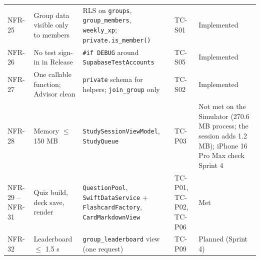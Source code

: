 \documentclass[12pt,letterpaper]{article}
\begin{document}
\begin{xltabular}{\textwidth}{@{}l L{3.2cm} Y l L{2.6cm}@{}}
NFR-25 & Group data visible only to members & RLS on \texttt{groups}, \texttt{group\_members}, \texttt{weekly\_xp}; \texttt{private.is\_member()} & TC-S01 & Implemented \\
NFR-26 & No test sign-in in Release & \texttt{\#if DEBUG} around \texttt{SupabaseTestAccounts} & TC-S05 & Implemented \\
NFR-27 & One callable function; Advisor clean & \texttt{private} schema for helpers; \texttt{join\_group} only & TC-S02 & Implemented \\
NFR-28 & Memory $\le$ 150 MB & \texttt{StudySessionViewModel}, \texttt{StudyQueue} & TC-P03 & Not met on the Simulator (270.6 MB process; the session adds 1.2 MB); iPhone 16 Pro Max check Sprint 4 \\
NFR-29 -- NFR-31 & Quiz build, deck save, render & \texttt{QuestionPool}, \texttt{SwiftDataService} + \texttt{FlashcardFactory}, \texttt{CardMarkdownView} & TC-P01, TC-P02, TC-P06 & Met \\
NFR-32 & Leaderboard $\le$ 1.5 s & \texttt{group\_leaderboard} view (one request) & TC-P09 & Planned (Sprint 4) \\
\end{xltabular}
\end{document}
